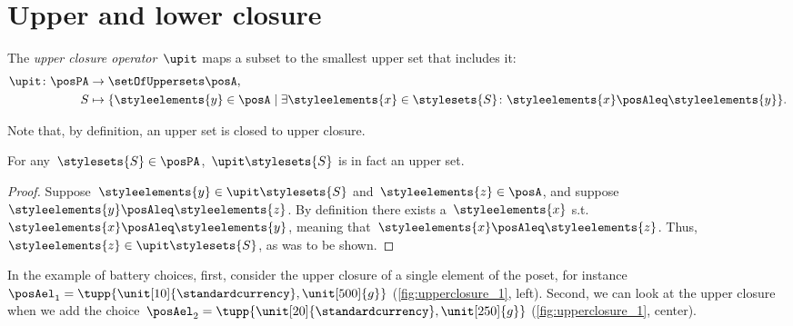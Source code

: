 
\section[Antichains]{Upper and lower closure}

\begin{definition}
    \label{def:upperclosure}
    The \emph{upper closure operator}~$\upit $ maps a subset to the smallest upper set that includes it:
    \begin{equation}
        \begin{aligned}
            \upit  \colon \posPA & \to \setOfUppersets\posA, \\
            S                    & \mapsto \{\styleelements{y}\in \posA \mid \exists \styleelements{x}\in \stylesets{S} \colon \styleelements{x}\posAleq \styleelements{y}\}.
        \end{aligned}
    \end{equation}
\end{definition}
\begin{remark}
    Note that, by definition, an upper set is closed to upper closure.
\end{remark}
\begin{lemma}
    For any~$\stylesets{S}\in \posPA$,~$\upit  \stylesets{S}$ is in fact an upper set.
\end{lemma}
\begin{proof}
    Suppose~$\styleelements{y}\in \upit  \stylesets{S}$ and~$\styleelements{z}\in \posA$, and suppose $\styleelements{y}\posAleq \styleelements{z}$.
    By definition there exists a~$\styleelements{x}$ s.t.~$\styleelements{x}\posAleq \styleelements{y}$, meaning that~$\styleelements{x}\posAleq \styleelements{z}$.
    Thus,~$\styleelements{z}\in \upit  \stylesets{S}$, as was to be shown.
\end{proof}

In the example of battery choices,  first, consider the upper closure of a single element of the poset, for instance~$\posAel_1=\tupp{\unit[10]{\standardcurrency},\unit[500]{g}}$ (\cref{fig:upperclosure_1}, left).
Second, we can look at the upper closure when we add the choice~$\posAel_2=\tupp{\unit[20]{\standardcurrency},\unit[250]{g}}$ (\cref{fig:upperclosure_1}, center).


